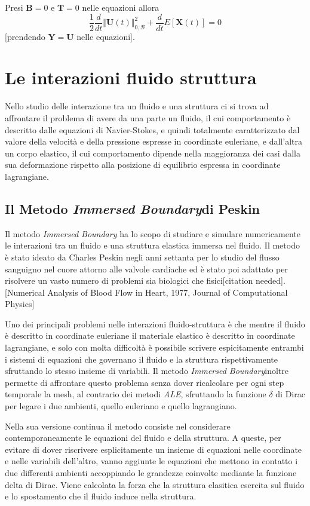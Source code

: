 \documentclass{book}
\newcommand{\IB}{\textit{Immersed Boundary}}
\begin{document}
Presi $\mathbf{B}=0$ e $\mathbf{T}=0$ nelle equazioni allora
$$\frac{1}{2}\frac{d}{dt}\Vert\mathbf{U}(t)\Vert^2_{0,\mathcal{B}}+\frac{d}{dt}E[\mathbf{X}(t)]=0$$
[prendendo $\mathbf{Y}=\mathbf{U}$ nelle equazioni].

\chapter{Le interazioni fluido struttura}

Nello studio delle interazione tra un fluido e una struttura ci si trova ad affrontare il problema di avere da una parte un fluido, il cui comportamento è descritto dalle equazioni di Navier-Stokes, e quindi totalmente caratterizzato dal valore della velocità e della pressione espresse in coordinate euleriane, e dall'altra un corpo elastico, il cui comportamento dipende nella maggioranza dei casi dalla sua deformazione rispetto alla posizione di equilibrio espressa in coordinate lagrangiane.

\section{Il Metodo \IB di Peskin}

Il metodo \textit{Immersed Boundary} ha lo scopo di studiare e simulare numericamente le interazioni tra un fluido e una struttura elastica immersa nel fluido. Il metodo è stato ideato da Charles Peskin negli anni settanta per lo studio del flusso sanguigno nel cuore attorno alle valvole cardiache ed è stato poi adattato per risolvere un vasto numero di problemi sia biologici che fisici[citation needed]. [Numerical Analysis of Blood Flow in Heart, 1977, Journal of Computational Physics]

Uno dei principali problemi nelle interazioni fluido-struttura è che mentre il fluido è descritto in coordinate euleriane il materiale elastico è descritto in coordinate lagrangiane, e solo con molta difficoltà è possibile scrivere espicitamente entrambi i sistemi di equazioni che governano il fluido e la struttura rispettivamente sfruttando lo stesso insieme di variabili. Il metodo \IB inoltre permette di affrontare questo problema senza dover ricalcolare per ogni step temporale la mesh, al contrario dei metodi \textit{ALE}, sfruttando la funzione $\delta$ di Dirac per legare i due ambienti, quello euleriano e quello lagrangiano.

Nella sua versione continua il metodo consiste nel considerare contemporaneamente le equazioni del fluido e della struttura. A queste, per evitare di dover riscrivere esplicitamente un insieme di equazioni nelle  coordinate e nelle variabili dell'altro, vanno aggiunte le equazioni che mettono in contatto i due differenti ambienti accoppiando le grandezze coinvolte mediante la funzione delta di Dirac. Viene calcolata la forza che la struttura elasitica esercita sul fluido e lo spostamento che il fluido induce nella struttura.
\end{document}

